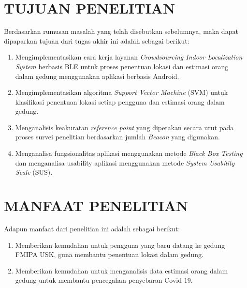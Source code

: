 \section{\uppercase{TUJUAN PENELITIAN}}
Berdasarkan rumusan masalah yang telah disebutkan sebelumnya, maka dapat dipaparkan tujuan dari tugas akhir ini adalah sebagai berikut:
\begin{enumerate}
	\item Mengimplementasikan cara kerja layanan \textit{Crowdsourcing Indoor Localization System} berbasis BLE untuk proses penentuan lokasi dan estimasi orang dalam gedung menggunakan aplikasi berbasis Android.
	\item Mengimplementasikan algoritma \textit{\textit{Support Vector Machine}} (SVM) untuk klasifikasi penentuan lokasi setiap pengguna dan estimasi orang dalam gedung.
	\item Menganalisis keakuratan \textit{reference point} yang dipetakan secara urut pada proses survei penelitian berdasarkan jumlah \textit{Beacon} yang digunakan.
	\item Menganalisa fungsionalitas aplikasi menggunakan metode \textit{Black Box Testing} dan menganalisa usability aplikasi menggunakan metode \textit{System Usability Scale} (SUS).
\end{enumerate}


\section{\uppercase{MANFAAT PENELITIAN}}
Adapun manfaat dari penelitian ini adalah sebagai berikut:
\begin{enumerate}
	\item Memberikan kemudahan untuk pengguna yang baru datang ke gedung FMIPA USK, guna membantu penentuan lokasi dalam gedung.
	\item Memberikan kemudahan untuk menganalisis data estimasi orang dalam gedung untuk membantu pencegahan penyebaran Covid-19.

\end{enumerate}


\begin{comment}

\end{comment}